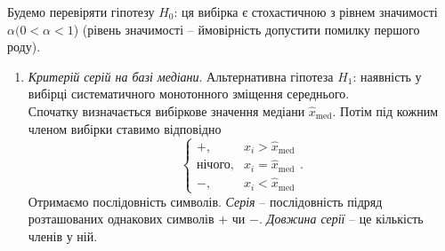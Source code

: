 Будемо перевіряти гіпотезу $H_0$: ця вибірка є стохастичною з рівнем значимості $\alpha (0 < \alpha < 1$) (рівень значимості -- ймовірність допустити помилку першого роду).
\begin{enumerate}
	\item \textit{Критерій серій на базі медіани}. Альтернативна гіпотеза $H_1$: наявність у вибірці систематичного монотонного зміщення середнього. \\

	Спочатку визначається вибіркове значення медіани $\widehat{x}_{\text{med}}$. Потім під кожним членом вибірки ставимо відповідно \[ \begin{cases} +, & x_i > \widehat{x}_{\text{med}} \\
 \text{нічого}, & x_i = \widehat{x}_{\text{med}} \\
 -, & x_i < \widehat{x}_{\text{med}} \end{cases}. \]
	Отримаємо послідовність символів. \textit{Серія} -- послідовність підряд розташованих однакових символів $+$ чи $-$. \textit{Довжина серії} -- це кількість членів у ній. \\


\end{enumerate}
